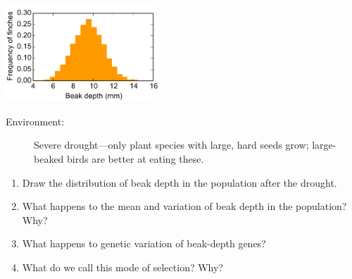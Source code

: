 \begin{frame}[t]
\begin{adjustwidth}{-1.5em}{-1.5em}
    \small
    \vspace{-0.3cm}
    \includegraphics[width=0.43\textwidth]{../images/my-beak-depth-histogram.pdf}

    \vspace{-0.2cm}
    \begin{description}
        \item[Environment:]
            Severe drought---only plant species with large, hard seeds grow;
            large-beaked birds are better at eating these.
    \end{description}

    \vspace{-0.2cm}
    \begin{enumerate}
            \small
        \item Draw the distribution of beak depth in the population after the
                drought.
        \item What happens to the mean and variation of beak depth in the
                population? Why?
        \item What happens to genetic variation of beak-depth genes?
        \item What do we call this mode of selection? Why?
    \end{enumerate}
\end{adjustwidth}
\end{frame}

